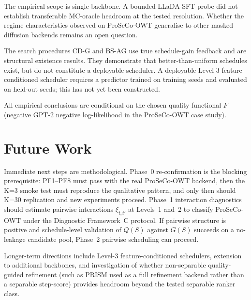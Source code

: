 The empirical scope is single-backbone. A bounded LLaDA-SFT probe did not
establish transferable MC-oracle headroom at the tested resolution. Whether
the regime characteristics observed on ProSeCo-OWT generalise to other masked
diffusion backends remains an open question.

The search procedures CD-G and BS-AG use true schedule-gain feedback and are
structural existence results. They demonstrate that better-than-uniform
schedules exist, but do not constitute a deployable scheduler. A deployable
Level-3 feature-conditioned scheduler requires a predictor trained on training
seeds and evaluated on held-out seeds; this has not yet been constructed.

All empirical conclusions are conditional on the chosen quality functional
$F$ (negative GPT-2 negative log-likelihood in the ProSeCo-OWT case study).

\section{Future Work}
\label{sec:ch8-future-work}

Immediate next steps are methodological. Phase~0 re-confirmation is the
blocking prerequisite: PF1--PF8 must pass with the real ProSeCo-OWT backend,
then the K=3 smoke test must reproduce the qualitative pattern, and only then
should K=30 replication and new experiments proceed. Phase~1 interaction
diagnostics should estimate pairwise interactions $\xi_{t,t'}$ at Levels~1
and~2 to classify ProSeCo-OWT under the Diagnostic Framework~C protocol.
If pairwise structure is positive and schedule-level validation of $Q(S)$
against $G(S)$ succeeds on a no-leakage candidate pool, Phase~2 pairwise
scheduling can proceed.

Longer-term directions include Level-3 feature-conditioned schedulers,
extension to additional backbones, and investigation of whether non-separable
quality-guided refinement (such as PRISM used as a full refinement backend
rather than a separable step-score) provides headroom beyond the tested
separable ranker class.
